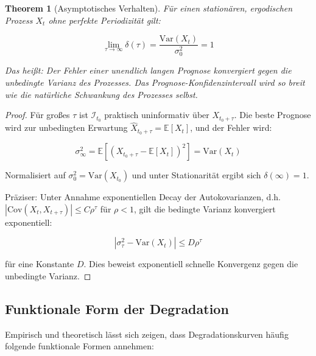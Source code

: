 \documentclass[a4paper, 12pt, twoside, openright]{report}
\newtheorem{theorem}{Theorem}[section]
\theoremstyle{definition}
\theoremstyle{definition}
\newcommand{\E}{\mathbb{E}}
\newcommand{\Var}{\mathrm{Var}}
\newcommand{\Cov}{\mathrm{Cov}}
\begin{document}
\begin{theorem}[Asymptotisches Verhalten]
\label{thm:asymptotic}
Für einen stationären, ergodischen Prozess $X_t$ ohne perfekte Periodizität gilt:

\begin{equation}
\lim_{\tau \to \infty} \delta(\tau) = \frac{\Var(X_t)}{\sigma_0^2} = 1
\end{equation}

Das heißt: Der Fehler einer unendlich langen Prognose konvergiert gegen die unbedingte Varianz des Prozesses. Das Prognose-Konfidenzintervall wird so breit wie die natürliche Schwankung des Prozesses selbst.
\end{theorem}

\begin{proof}
Für großes $\tau$ ist $\mathcal{I}_{t_0}$ praktisch uninformativ über $X_{t_0+\tau}$. Die beste Prognose wird zur unbedingten Erwartung $\hat{X}_{t_0+\tau} = \E[X_t]$, und der Fehler wird:

\begin{equation}
\sigma_\infty^2 = \E[(X_{t_0+\tau} - \E[X_t])^2] = \Var(X_t)
\end{equation}

Normalisiert auf $\sigma_0^2 = \Var(X_{t_0})$ und unter Stationarität ergibt sich $\delta(\infty) = 1$.

Präziser: Unter Annahme exponentiellen Decay der Autokovarianzen, d.h. $|\Cov(X_t, X_{t+\tau})| \leq C \rho^\tau$ für $\rho < 1$, gilt die bedingte Varianz konvergiert exponentiell:

\begin{equation}
|\sigma_\tau^2 - \Var(X_t)| \leq D \rho^\tau
\end{equation}

für eine Konstante $D$. Dies beweist exponentiell schnelle Konvergenz gegen die unbedingte Varianz.
\end{proof}

\subsection{Funktionale Form der Degradation}

Empirisch und theoretisch lässt sich zeigen, dass Degradationskurven häufig folgende funktionale Formen annehmen:
\end{document}
